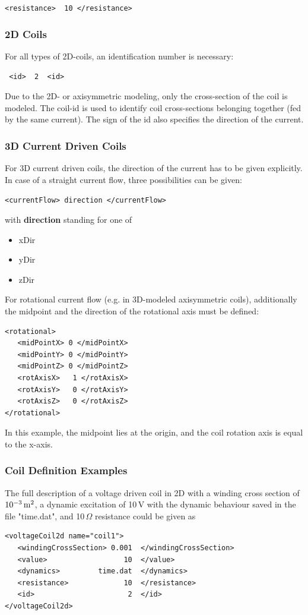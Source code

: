 \verb!<resistance>  10 </resistance>!

\subsubsection{2D Coils}
For all types of 2D-coils, an identification number is
necessary:

\verb! <id>  2  <id>!

\noindent
Due to the 2D- or axisymmetric modeling, only the cross-section of the
coil is modeled. The coil-id is
used to identify coil cross-sections belonging together (fed by the
same current). 
The sign of the id also specifies the direction of the current.

\subsubsection{3D Current Driven Coils}
For 3D current driven coils, the direction of the current has to be
given explicitly. In case of a straight current flow, three
possibilities can be given:

\verb!<currentFlow> direction </currentFlow>!

\noindent
with {\bf direction} standing for one of 
\begin{itemize}
\item xDir
\item yDir
\item zDir
\end{itemize}
   
For rotational current flow (e.g. in 3D-modeled axisymmetric coils),
additionally the midpoint and the direction of the rotational axis
must be defined:

\begin{verbatim}
<rotational>
   <midPointX> 0 </midPointX>
   <midPointY> 0 </midPointY>
   <midPointZ> 0 </midPointZ>
   <rotAxisX>   1 </rotAxisX>
   <rotAxisY>   0 </rotAxisY>
   <rotAxisZ>   0 </rotAxisZ>
</rotational>
\end{verbatim}

In this example, the midpoint lies at the origin, and the coil
rotation axis is equal to the x-axis.

\subsubsection{Coil Definition Examples}

The full description of a voltage driven coil in 2D with a winding
cross section of $10^{-3}\, \rm m^2$, a dynamic excitation of 10\,V with
the dynamic behaviour saved in the file "time.dat", 
and 10\,$\Omega$ resistance could be given as
\begin{verbatim}
<voltageCoil2d name="coil1">
   <windingCrossSection> 0.001  </windingCrossSection>
   <value>                  10  </value>
   <dynamics>         time.dat  </dynamics>
   <resistance>             10  </resistance>
   <id>                      2  </id>
</voltageCoil2d>
\end{verbatim}

